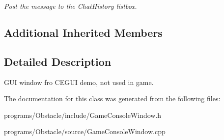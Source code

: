 \begin{DoxyCompactItemize}
\begin{DoxyCompactList}\small\item\em Post the message to the Chat\+History listbox. \end{DoxyCompactList}\end{DoxyCompactItemize}
\subsection*{Additional Inherited Members}


\subsection{Detailed Description}
G\+UI window fro C\+E\+G\+UI demo, not used in game. 

The documentation for this class was generated from the following files\+:\begin{DoxyCompactItemize}
\item 
programs/\+Obstacle/include/Game\+Console\+Window.\+h\item 
programs/\+Obstacle/source/Game\+Console\+Window.\+cpp\end{DoxyCompactItemize}
